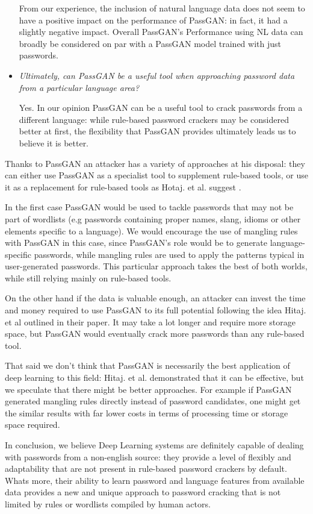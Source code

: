 \begin{itemize}
From our experience, the inclusion of natural language data does not seem to have a positive impact on the performance of PassGAN: in fact, it had a slightly negative impact. Overall PassGAN's Performance using NL data can broadly be considered on par with a PassGAN model trained with just passwords.
\clearpage 
\item \emph{Ultimately, can PassGAN be a useful tool when approaching password data from a particular language area?} %

Yes. In our opinion PassGAN can be a useful tool to crack passwords from a different language: while rule-based password crackers may be considered better at first, the flexibility that PassGAN provides ultimately leads us to believe it is better.

\end{itemize}
Thanks to PassGAN an attacker has a variety of approaches at his disposal: they can either use PassGAN as a specialist tool to supplement rule-based tools, or use it as a replacement for rule-based tools as Hotaj. et al. suggest \cite{PassGAN}. 

In the first case PassGAN would be used to tackle passwords that may not be part of wordlists (e.g passwords containing  proper names, slang, idioms or other elements specific to a language). 
We would encourage the use of mangling rules with PassGAN in this case, since  PassGAN's role would be to generate language-specific passwords, while mangling rules are used to apply the patterns typical in user-generated passwords. This particular approach takes the best of both worlds, while still relying mainly on rule-based tools.

On the other hand if the data is valuable enough, an attacker can invest the time and money required to use PassGAN to its full potential following the idea Hitaj. et al \cite{PassGAN} outlined in their paper. It may take a lot longer and require more storage space, but PassGAN would eventually crack more passwords than any rule-based tool.

That said we don't think that PassGAN is necessarily the best application of deep learning to this field: Hitaj. et al. demonstrated that it can be effective, but we speculate that there might be better approaches. For example if PassGAN generated mangling rules directly instead of password candidates, one might get the similar results with far lower costs in terms of processing time or storage space required.

In conclusion, we believe Deep Learning systems are definitely capable of dealing with passwords from a non-english source: they provide a level of flexibly and adaptability that are not present in rule-based password crackers by default. Whats more, their ability to learn password and language features from available data provides a new and unique approach to password cracking that is not limited by rules or wordlists compiled by human actors.
